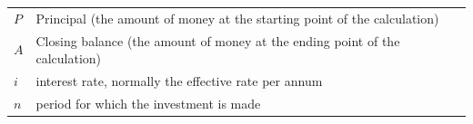 \begin{itemize}[noitemsep]
{{    %
        \begin{center}
      \label{m39335*id75382}
    \noindent
    \begin{tabular}[t]{|l|l|}\hline
                  $P$
                 &
        Principal (the amount of money at the starting point of the calculation)%
     \tabularnewline\cline{1-1}\cline{2-2}
                  $A$
                 &
        Closing balance (the amount of money at the ending point of the calculation)%
     \tabularnewline\cline{1-1}\cline{2-2}
                  $i$
                 &
        interest rate, normally the effective rate per annum%
     \tabularnewline\cline{1-1}\cline{2-2}
                  $n$
                 &
        period for which the investment is made%

\end{tabular}
\end{center}}}
\end{itemize}
